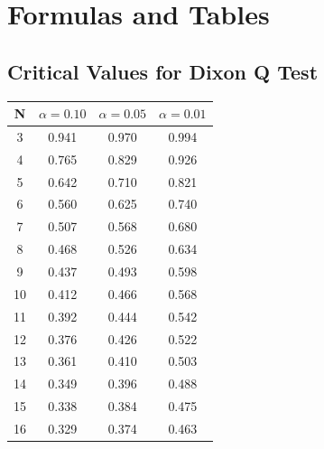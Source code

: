 \documentclass[a4paper,12pt]{article}
\begin{document}
\section*{Formulas and Tables}

\subsection*{Critical Values for Dixon Q Test}
{
	\Large
	\begin{center}
		\begin{tabular}{|c|c|c|c|}
			\hline  N  & $\alpha=0.10$  & $\alpha=0.05$  & $\alpha=0.01$  \\ \hline
			3  & 0.941 & 0.970 & 0.994 \\ \hline
			4  & 0.765 & 0.829 & 0.926 \\ \hline
			5  & 0.642 & 0.710  & 0.821 \\ \hline
			6  & 0.560 & 0.625 & 0.740 \\ \hline
			7  & 0.507 & 0.568 & 0.680  \\ \hline
			8  & 0.468 & 0.526 & 0.634 \\ \hline
			9  & 0.437 & 0.493 & 0.598 \\ \hline
			10 & 0.412 & 0.466 & 0.568 \\ \hline
			11 & 0.392 & 0.444 & 0.542 \\ \hline
			12 & 0.376 & 0.426 & 0.522 \\ \hline
			13 & 0.361 & 0.410 & 0.503 \\ \hline
			14 & 0.349 & 0.396 & 0.488 \\ \hline
			15 & 0.338 & 0.384 & 0.475 \\ \hline
			16 & 0.329 & 0.374 & 0.463 \\ \hline
		\end{tabular} 
	\end{center}
}
\end{document}
